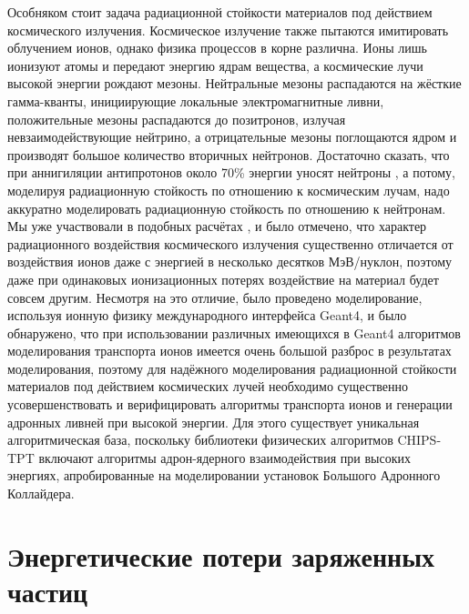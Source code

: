 \documentclass[a4paper,12pt]{article}
\begin{document}
\begin{large}
	Особняком стоит задача радиационной стойкости материалов под действием космического излучения.
	Космическое излучение также пытаются имитировать облучением ионов, однако физика процессов в корне различна.
	Ионы лишь ионизуют атомы и передают энергию ядрам вещества, а космические лучи высокой энергии рождают мезоны. Нейтральные мезоны распадаются на жёсткие гамма-кванты, инициирующие локальные электромагнитные ливни, положительные мезоны распадаются до позитронов, излучая невзаимодействующие нейтрино, а отрицательные мезоны поглощаются ядром и производят большое количество вторичных нейтронов.
	Достаточно сказать, что при аннигиляции антипротонов около 70\% энергии уносят нейтроны \cite{CHIPS_AP}, а потому, моделируя радиационную стойкость по отношению к космическим лучам, надо аккуратно моделировать радиационную стойкость по отношению к нейтронам.
	Мы уже участвовали в подобных расчётах \cite{70/435-T}, и было отмечено, что характер радиационного воздействия космического излучения существенно отличается от воздействия ионов даже с энергией в несколько десятков МэВ/нуклон, поэтому даже при одинаковых ионизационных потерях воздействие на материал будет совсем другим.
	Несмотря на это отличие, было проведено моделирование, используя ионную физику международного интерфейса Geant4, и было обнаружено, что при использовании различных имеющихся в Geant4 алгоритмов моделирования транспорта ионов имеется очень большой разброс в результатах моделирования, поэтому для надёжного моделирования радиационной стойкости материалов под действием космических лучей необходимо существенно усовершенствовать и верифицировать алгоритмы транспорта ионов и генерации адронных ливней при высокой энергии.
	Для этого существует уникальная алгоритмическая база, поскольку библиотеки физических алгоритмов CHIPS-TPT включают алгоритмы адрон-ядерного взаимодействия при высоких энергиях, апробированные на моделировании установок Большого Адронного Коллайдера.

\clearpage
\section{Энергетические потери заряженных частиц}
\label{dEdx}


\end{large}
\end{document}
